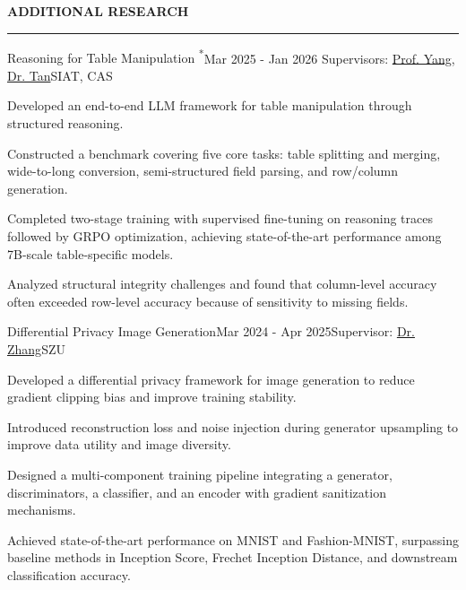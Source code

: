 \documentclass{resume} %
\renewenvironment{rSection}[1]{
  \sectionskip
  \textbf{\MakeUppercase{#1}}
  \sectionlineskip
  \hrule
  \begin{list}{}{
  \setlength{\leftmargin}{1.5em}
  }
  \item[]
  }{
  \end{list}
  }
\begin{document}
\clearpage

  \begin{rSection}{Additional Research}

  \begin{rSubsection}{Reasoning for Table Manipulation \textsuperscript{*}}{Mar 2025 - Jan 2026}
  {Supervisors: \href{https://minyang.me/}{Prof. Yang}, \href{https://szs.siat.ac.cn/siat/2025-02/21/article_2025022105340818693.html}{Dr. Tan}}{SIAT, CAS}
  \item Developed an end-to-end LLM framework for table manipulation through structured reasoning.
  \item Constructed a benchmark covering five core tasks: table splitting and merging, wide-to-long
  conversion, semi-structured field parsing, and row/column generation.
  \item Completed two-stage training with supervised fine-tuning on reasoning traces followed by
  GRPO optimization, achieving state-of-the-art performance among 7B-scale table-specific models.
  \item Analyzed structural integrity challenges and found that column-level accuracy often exceeded
  row-level accuracy because of sensitivity to missing fields.
  \end{rSubsection}

  \begin{rSubsection}{Differential Privacy Image Generation}{Mar 2024 - Apr 2025}{Supervisor:
  \href{https://fe.szu.edu.cn/info/1023/1133.htm}{Dr. Zhang}}{SZU}
  \item Developed a differential privacy framework for image generation to reduce gradient clipping
  bias and improve training stability.
  \item Introduced reconstruction loss and noise injection during generator upsampling to improve
  data utility and image diversity.
  \item Designed a multi-component training pipeline integrating a generator, discriminators, a
  classifier, and an encoder with gradient sanitization mechanisms.
  \item Achieved state-of-the-art performance on MNIST and Fashion-MNIST, surpassing baseline
  methods in Inception Score, Frechet Inception Distance, and downstream classification accuracy.
  \end{rSubsection}

  \end{rSection}
\end{document}
